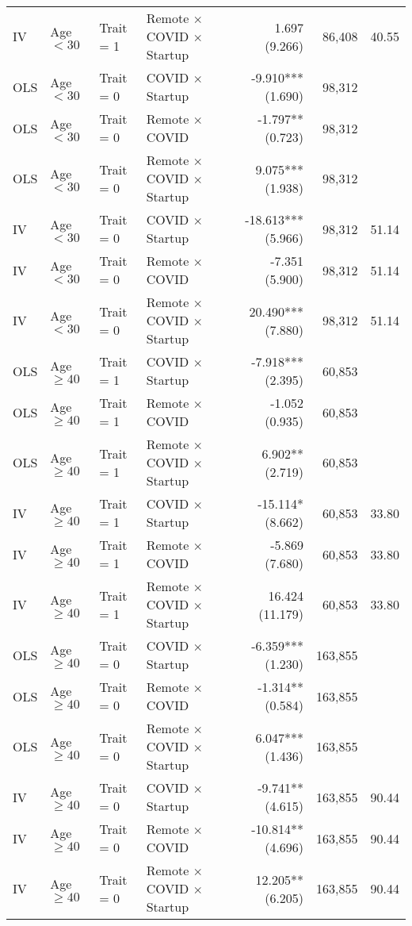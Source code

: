 \documentclass[11pt]{article}
\begin{document}
{\begin{longtable}{llllrrr}
IV & Age $< 30$ & Trait = 1 & Remote $\times$ COVID $\times$ Startup &  1.697 (9.266) & 86,408 & 40.55 \\
OLS & Age $< 30$ & Trait = 0 & COVID $\times$ Startup & -9.910*** (1.690) & 98,312 &  \\
OLS & Age $< 30$ & Trait = 0 & Remote $\times$ COVID & -1.797** (0.723) & 98,312 &  \\
OLS & Age $< 30$ & Trait = 0 & Remote $\times$ COVID $\times$ Startup &  9.075*** (1.938) & 98,312 &  \\
IV & Age $< 30$ & Trait = 0 & COVID $\times$ Startup & -18.613*** (5.966) & 98,312 & 51.14 \\
IV & Age $< 30$ & Trait = 0 & Remote $\times$ COVID & -7.351 (5.900) & 98,312 & 51.14 \\
IV & Age $< 30$ & Trait = 0 & Remote $\times$ COVID $\times$ Startup &  20.490*** (7.880) & 98,312 & 51.14 \\
OLS & Age $\ge 40$ & Trait = 1 & COVID $\times$ Startup & -7.918*** (2.395) & 60,853 &  \\
OLS & Age $\ge 40$ & Trait = 1 & Remote $\times$ COVID & -1.052 (0.935) & 60,853 &  \\
OLS & Age $\ge 40$ & Trait = 1 & Remote $\times$ COVID $\times$ Startup &  6.902** (2.719) & 60,853 &  \\
IV & Age $\ge 40$ & Trait = 1 & COVID $\times$ Startup & -15.114* (8.662) & 60,853 & 33.80 \\
IV & Age $\ge 40$ & Trait = 1 & Remote $\times$ COVID & -5.869 (7.680) & 60,853 & 33.80 \\
IV & Age $\ge 40$ & Trait = 1 & Remote $\times$ COVID $\times$ Startup &  16.424 (11.179) & 60,853 & 33.80 \\
OLS & Age $\ge 40$ & Trait = 0 & COVID $\times$ Startup & -6.359*** (1.230) & 163,855 &  \\
OLS & Age $\ge 40$ & Trait = 0 & Remote $\times$ COVID & -1.314** (0.584) & 163,855 &  \\
OLS & Age $\ge 40$ & Trait = 0 & Remote $\times$ COVID $\times$ Startup &  6.047*** (1.436) & 163,855 &  \\
IV & Age $\ge 40$ & Trait = 0 & COVID $\times$ Startup & -9.741** (4.615) & 163,855 & 90.44 \\
IV & Age $\ge 40$ & Trait = 0 & Remote $\times$ COVID & -10.814** (4.696) & 163,855 & 90.44 \\
IV & Age $\ge 40$ & Trait = 0 & Remote $\times$ COVID $\times$ Startup &  12.205** (6.205) & 163,855 & 90.44 \\
\end{longtable}

}
\end{document}
